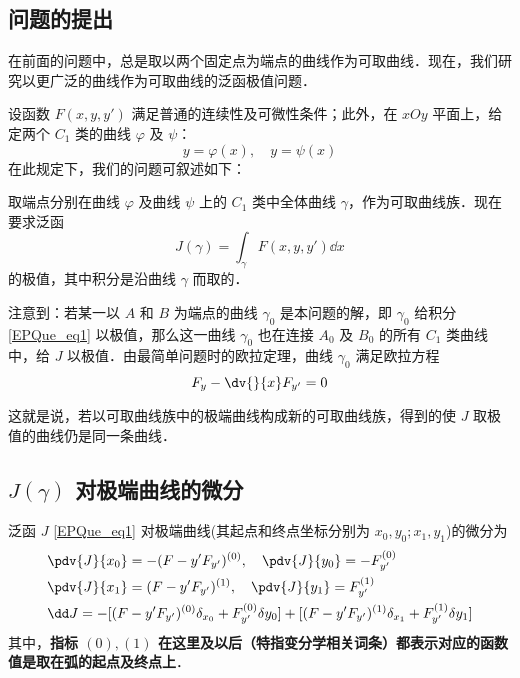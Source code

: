 
\begin{issues}
\issueTODO
\end{issues}

\subsection{问题的提出}在前面的问题中，总是取以两个固定点为端点的曲线作为可取曲线．现在，我们研究以更广泛的曲线作为可取曲线的泛函极值问题．

设函数 $F(x,y,y')$ 满足普通的连续性及可微性条件；此外，在 $xOy$ 平面上，给定两个 $C_1$ 类的曲线 $\varphi$ 及 $\psi$：
\begin{equation}
y=\varphi(x),\quad y=\psi(x)
\end{equation}
在此规定下，我们的问题可叙述如下：

取端点分别在曲线 $\varphi$ 及曲线 $\psi$ 上的 $C_1$ 类中全体曲线 $\gamma$，作为可取曲线族．现在要求泛函
\begin{equation}\label{EPQue_eq1}
J(\gamma)=\int_\gamma F(x,y,y')\dd x
\end{equation}
的极值，其中积分是沿曲线 $\gamma$ 而取的．

注意到：若某一以 $A$ 和 $B$ 为端点的曲线 $\gamma_0$ 是本问题的解，即 $\gamma_0$ 给积分\autoref{EPQue_eq1} 以极值，那么这一曲线 $\gamma_0$ 也在连接 $A_0$ 及 $B_0$ 的所有 $C_1$ 类曲线中，给 $J$ 以极值．由最简单问题时的欧拉定理，曲线 $\gamma_0$ 满足欧拉方程
\begin{equation}
F_y-\dv{}{x}F_{y'}=0
\end{equation}

这就是说，若以可取曲线族中的极端曲线构成新的可取曲线族，得到的使 $J$ 取极值的曲线仍是同一条曲线．
\subsection{$J(\gamma)$ 对极端曲线的微分} 
\begin{theorem}{}
泛函 $J$ \autoref{EPQue_eq1} 对极端曲线(其起点和终点坐标分别为 $x_0,y_0;x_1,y_1$)的微分为
\begin{equation}
\begin{aligned}
&\pdv{J}{x_0}=-(F-y'F_{y'})^{(0)},\quad \pdv{J}{y_0}=-F_{y'}^{(0)}\\
&\pdv{J}{x_1}=(F-y'F_{y'})^{(1)},\quad \pdv{J}{y_1}=F_{y'}^{(1)}\\
&\dd J=-[(F-y'F_{y'})^{(0)}\delta_{x_0}+ F_{y'}^{(0)}\delta y_0]+[(F-y'F_{y'})^{(1)}\delta_{x_1}+F_{y'}^{(1)}\delta y_1]
\end{aligned}
\end{equation}
其中，\textbf{指标 ${(0)},{(1)}$ 在这里及以后（特指变分学相关词条）都表示对应的函数值是取在弧的起点及终点上}．
\end{theorem}
